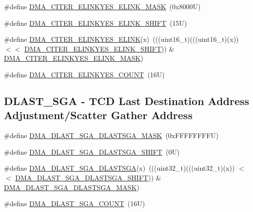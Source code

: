 \begin{DoxyCompactItemize}
\item 
\#define \mbox{\hyperlink{group___d_m_a___register___masks_ga1f0a2f5fd8eaf8a52fcea91e57e48c11}{D\+M\+A\+\_\+\+C\+I\+T\+E\+R\+\_\+\+E\+L\+I\+N\+K\+Y\+E\+S\+\_\+\+E\+L\+I\+N\+K\+\_\+\+M\+A\+SK}}~(0x8000\+U)
\item 
\#define \mbox{\hyperlink{group___d_m_a___register___masks_ga8934a876cf4971db85286742f46b1ddb}{D\+M\+A\+\_\+\+C\+I\+T\+E\+R\+\_\+\+E\+L\+I\+N\+K\+Y\+E\+S\+\_\+\+E\+L\+I\+N\+K\+\_\+\+S\+H\+I\+FT}}~(15\+U)
\item 
\#define \mbox{\hyperlink{group___d_m_a___register___masks_gac7abdef93f27ca27de55598908e89727}{D\+M\+A\+\_\+\+C\+I\+T\+E\+R\+\_\+\+E\+L\+I\+N\+K\+Y\+E\+S\+\_\+\+E\+L\+I\+NK}}(x)~(((uint16\+\_\+t)(((uint16\+\_\+t)(x)) $<$$<$ \mbox{\hyperlink{group___d_m_a___register___masks_ga8934a876cf4971db85286742f46b1ddb}{D\+M\+A\+\_\+\+C\+I\+T\+E\+R\+\_\+\+E\+L\+I\+N\+K\+Y\+E\+S\+\_\+\+E\+L\+I\+N\+K\+\_\+\+S\+H\+I\+FT}})) \& \mbox{\hyperlink{group___d_m_a___register___masks_ga1f0a2f5fd8eaf8a52fcea91e57e48c11}{D\+M\+A\+\_\+\+C\+I\+T\+E\+R\+\_\+\+E\+L\+I\+N\+K\+Y\+E\+S\+\_\+\+E\+L\+I\+N\+K\+\_\+\+M\+A\+SK}})
\item 
\#define \mbox{\hyperlink{group___d_m_a___register___masks_ga81b87cd863bf7e9b424f05e751c760d9}{D\+M\+A\+\_\+\+C\+I\+T\+E\+R\+\_\+\+E\+L\+I\+N\+K\+Y\+E\+S\+\_\+\+C\+O\+U\+NT}}~(16\+U)
\end{DoxyCompactItemize}
\subsection*{D\+L\+A\+S\+T\+\_\+\+S\+GA -\/ T\+CD Last Destination Address Adjustment/\+Scatter Gather Address}
\begin{DoxyCompactItemize}
\item 
\#define \mbox{\hyperlink{group___d_m_a___register___masks_gaf1fd5a37254e4699b6c8a52601ae30d9}{D\+M\+A\+\_\+\+D\+L\+A\+S\+T\+\_\+\+S\+G\+A\+\_\+\+D\+L\+A\+S\+T\+S\+G\+A\+\_\+\+M\+A\+SK}}~(0x\+F\+F\+F\+F\+F\+F\+F\+F\+U)
\item 
\#define \mbox{\hyperlink{group___d_m_a___register___masks_gac7f56cf638102a09cb466aaa5b477a3d}{D\+M\+A\+\_\+\+D\+L\+A\+S\+T\+\_\+\+S\+G\+A\+\_\+\+D\+L\+A\+S\+T\+S\+G\+A\+\_\+\+S\+H\+I\+FT}}~(0\+U)
\item 
\#define \mbox{\hyperlink{group___d_m_a___register___masks_ga358ed52ff86816c240491d35576a8183}{D\+M\+A\+\_\+\+D\+L\+A\+S\+T\+\_\+\+S\+G\+A\+\_\+\+D\+L\+A\+S\+T\+S\+GA}}(x)~(((uint32\+\_\+t)(((uint32\+\_\+t)(x)) $<$$<$ \mbox{\hyperlink{group___d_m_a___register___masks_gac7f56cf638102a09cb466aaa5b477a3d}{D\+M\+A\+\_\+\+D\+L\+A\+S\+T\+\_\+\+S\+G\+A\+\_\+\+D\+L\+A\+S\+T\+S\+G\+A\+\_\+\+S\+H\+I\+FT}})) \& \mbox{\hyperlink{group___d_m_a___register___masks_gaf1fd5a37254e4699b6c8a52601ae30d9}{D\+M\+A\+\_\+\+D\+L\+A\+S\+T\+\_\+\+S\+G\+A\+\_\+\+D\+L\+A\+S\+T\+S\+G\+A\+\_\+\+M\+A\+SK}})
\item 
\#define \mbox{\hyperlink{group___d_m_a___register___masks_ga729c1477652675656435734a572b2d8b}{D\+M\+A\+\_\+\+D\+L\+A\+S\+T\+\_\+\+S\+G\+A\+\_\+\+C\+O\+U\+NT}}~(16\+U)
\end{DoxyCompactItemize}
